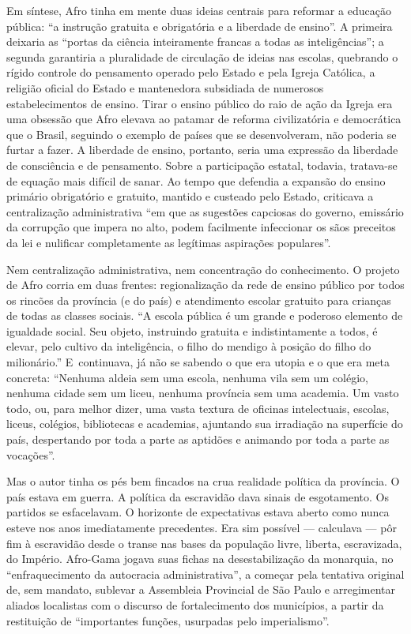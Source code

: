 Em síntese, Afro tinha em mente duas ideias centrais para
reformar a educação pública: ``a instrução gratuita e obrigatória e a
liberdade de ensino''. A primeira deixaria as ``portas da ciência
inteiramente francas a todas as inteligências''; a segunda garantiria a
pluralidade de circulação de ideias nas escolas, quebrando o rígido
controle do pensamento operado pelo Estado e pela Igreja Católica, a
religião oficial do Estado e mantenedora subsidiada de numerosos
estabelecimentos de ensino. Tirar o ensino público do raio de ação da
Igreja era uma obsessão que Afro elevava ao patamar de reforma
civilizatória e democrática que o Brasil, seguindo o exemplo de países
que se desenvolveram, não poderia se furtar a fazer. A liberdade de
ensino, portanto, seria uma expressão da liberdade de consciência e de
pensamento. Sobre a participação estatal, todavia, tratava-se de equação
mais difícil de sanar. Ao tempo que defendia a expansão do ensino
primário obrigatório e gratuito, mantido e custeado pelo Estado,
criticava a centralização administrativa ``em que as sugestões capciosas
do governo, emissário da corrupção que impera no alto, podem facilmente
infeccionar os sãos preceitos da lei e nulificar completamente as
legítimas aspirações populares''.

Nem centralização administrativa, nem concentração do conhecimento. O
projeto de Afro corria em duas frentes: regionalização da rede de
ensino público por todos os rincões da província (e do país) e
atendimento escolar gratuito para crianças de todas as classes sociais.
``A escola pública é um grande e poderoso elemento de igualdade social.
Seu objeto, instruindo gratuita e indistintamente a todos, é elevar,
pelo cultivo da inteligência, o filho do mendigo à posição do filho do
milionário.'' E~continuava, já não se sabendo o que era utopia e o que
era meta concreta: ``Nenhuma aldeia sem uma escola, nenhuma vila sem um
colégio, nenhuma cidade sem um liceu, nenhuma província sem uma
academia. Um vasto todo, ou, para melhor dizer, uma vasta textura de
oficinas intelectuais, escolas, liceus, colégios, bibliotecas e
academias, ajuntando sua irradiação na superfície do país, despertando
por toda a parte as aptidões e animando por toda a parte as vocações''.

Mas o autor tinha os pés bem fincados na crua realidade política da
província. O país estava em guerra. A política da escravidão dava sinais
de esgotamento. Os partidos se esfacelavam. O horizonte de expectativas
estava aberto como nunca esteve nos anos imediatamente precedentes. Era
sim possível --- calculava --- pôr fim à escravidão desde o transe nas
bases da população livre, liberta, escravizada, do Império.
Afro-Gama jogava suas fichas na desestabilização da monarquia, no
``enfraquecimento da autocracia administrativa'', a começar pela tentativa
original de, sem mandato, sublevar a Assembleia Provincial de São Paulo
e arregimentar aliados localistas com o discurso de fortalecimento dos
municípios, a partir da restituição de ``importantes funções, usurpadas
pelo imperialismo''.

